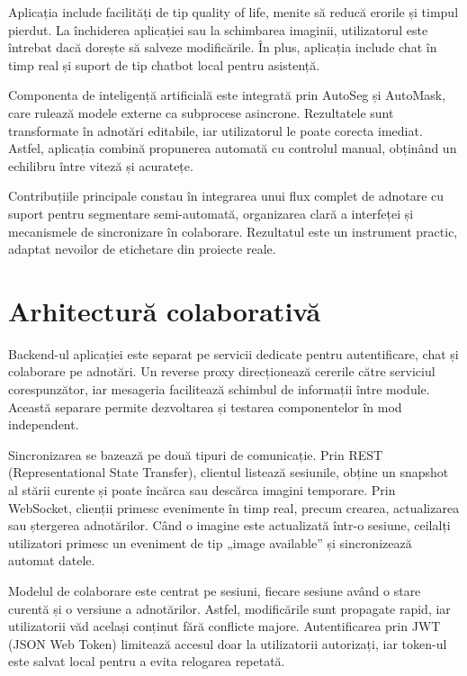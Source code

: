 Aplicația include facilități de tip quality of life, menite să reducă erorile și timpul pierdut. La închiderea aplicației sau la schimbarea imaginii, utilizatorul este întrebat dacă dorește să salveze modificările. În plus, aplicația include chat în timp real și suport de tip chatbot local pentru asistență.

Componenta de inteligență artificială este integrată prin AutoSeg și AutoMask, care rulează modele externe ca subprocese asincrone. Rezultatele sunt transformate în adnotări editabile, iar utilizatorul le poate corecta imediat. Astfel, aplicația combină propunerea automată cu controlul manual, obținând un echilibru între viteză și acuratețe.

Contribuțiile principale constau în integrarea unui flux complet de adnotare cu suport pentru segmentare semi-automată, organizarea clară a interfeței și mecanismele de sincronizare în colaborare. Rezultatul este un instrument practic, adaptat nevoilor de etichetare din proiecte reale.

\section{Arhitectură colaborativă}
Backend-ul aplicației este separat pe servicii dedicate pentru autentificare, chat și colaborare pe adnotări. Un reverse proxy direcționează cererile către serviciul corespunzător, iar mesageria facilitează schimbul de informații între module. Această separare permite dezvoltarea și testarea componentelor în mod independent.

Sincronizarea se bazează pe două tipuri de comunicație. Prin REST (Representational State Transfer), clientul listează sesiunile, obține un snapshot al stării curente și poate încărca sau descărca imagini temporare. Prin WebSocket, clienții primesc evenimente în timp real, precum crearea, actualizarea sau ștergerea adnotărilor. Când o imagine este actualizată într-o sesiune, ceilalți utilizatori primesc un eveniment de tip „image available” și sincronizează automat datele.

Modelul de colaborare este centrat pe sesiuni, fiecare sesiune având o stare curentă și o versiune a adnotărilor. Astfel, modificările sunt propagate rapid, iar utilizatorii văd același conținut fără conflicte majore. Autentificarea prin JWT (JSON Web Token) limitează accesul doar la utilizatorii autorizați, iar token-ul este salvat local pentru a evita relogarea repetată.

